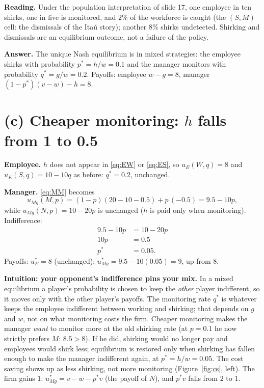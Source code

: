 \documentclass[11pt,a4paper]{article}
\newcommand{\answer}[1]{\begin{tcolorbox}[colback=ans!5,colframe=ans,boxrule=0.6pt,
  left=5pt,right=5pt,top=3pt,bottom=3pt]\textbf{Answer.} #1\end{tcolorbox}}
\begin{document}
\textbf{Reading.} Under the population interpretation of slide 17, one employee in ten shirks, one
in five is monitored, and $2\%$ of the workforce is caught (the $(S, M)$ cell: the dismissals of the
Itaú story); another $8\%$ shirks undetected. Shirking and dismissals are an equilibrium outcome, not
a failure of the policy.

\answer{The unique Nash equilibrium is in mixed strategies: the employee shirks with probability
$p^* = h/w = 0.1$ and the manager monitors with probability $q^* = g/w = 0.2$. Payoffs: employee
$w - g = 8$, manager $(1 - p^*)(v - w) - h = 8$.}

\section*{(c) Cheaper monitoring: $h$ falls from 1 to 0.5}

\textbf{Employee.} $h$ does not appear in \eqref{eq:EW} or \eqref{eq:ES}, so
$u_E(W, q) = 8$ and $u_E(S, q) = 10 - 10q$ as before: $q^* = 0.2$, unchanged.

\textbf{Manager.} \eqref{eq:MM} becomes
\[
  u_{M\!g}(M, p) = (1 - p)(20 - 10 - 0.5) + p\,(-0.5) = 9.5 - 10p,
\]
while $u_{M\!g}(N, p) = 10 - 20p$ is unchanged ($h$ is paid only when monitoring). Indifference:
\begin{align*}
  9.5 - 10p &= 10 - 20p\\
  10p &= 0.5\\
  p^* &= 0.05.
\end{align*}
Payoffs: $u_E^* = 8$ (unchanged); $u_{M\!g}^* = 9.5 - 10(0.05) = 9$, up from 8.

\textbf{Intuition: your opponent's indifference pins your mix.} In a mixed equilibrium a player's
probability is chosen to keep the \emph{other} player indifferent, so it moves only with the other
player's payoffs. The monitoring rate $q^*$ is whatever keeps the employee indifferent between working
and shirking; that depends on $g$ and $w$, not on what monitoring costs the firm. Cheaper monitoring
makes the manager \emph{want} to monitor more at the old shirking rate (at $p = 0.1$ he now strictly
prefers $M$: $8.5 > 8$). If he did, shirking would no longer pay and employees would shirk less;
equilibrium is restored only when shirking has fallen enough to make the manager indifferent again,
at $p^* = h/w = 0.05$. The cost saving shows up as less shirking, not more monitoring
(Figure~\ref{fig:cs}, left). The firm gains $1$: $u_{M\!g}^* = v - w - p^* v$ (the payoff of $N$), and
$p^* v$ falls from $2$ to $1$.
\end{document}

